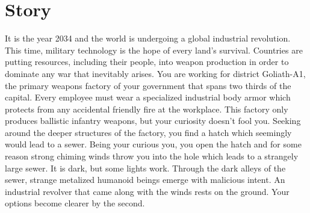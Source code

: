 \documentclass[../Main.tex]{subfiles}
\begin{document}
\section{Story}

It is the year 2034 and the world is undergoing a global industrial revolution. This time, military technology is the hope of every land's survival. Countries are putting resources, including their people, into weapon production in order to dominate any war that inevitably arises. You are working for district Goliath-A1, the primary weapons factory of your government that spans two thirds of the capital. Every employee must wear a specialized industrial body armor which protects from any accidental friendly fire at the workplace. This factory only produces ballistic infantry weapons, but your curiosity doesn't fool you. Seeking around the deeper structures of the factory, you find a hatch which seemingly would lead to a sewer. Being your curious you, you open the hatch and for some reason strong chiming winds throw you into the hole which leads to a strangely large sewer. It is dark, but some lights work. Through the dark alleys of the sewer, strange metalized humanoid beings emerge with malicious intent. An industrial revolver that came along with the winds rests on the ground. Your options become clearer by the second.
\end{document}
